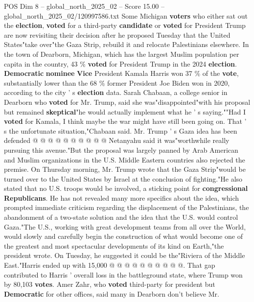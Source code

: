 \begin{textsample}{POS Dim 8 – global\_north\_2025\_02 – Score 15.00 – global\_north\_2025\_02/120997586.txt}  \label{ex:f8_pos_309}
Some Michigan \textbf{voters} who either sat out the \textbf{election}, \textbf{voted} for a third-party \textbf{candidate} or \textbf{voted} for President Trump are now revisiting their decision after he proposed Tuesday that the United States"take over"the Gaza Strip, rebuild it and relocate Palestinians elsewhere.
In the town of Dearborn, Michigan, which has the largest Muslim population per capita in the country, 43 \% \textbf{voted} for President Trump in the 2024 \textbf{election}. \textbf{Democratic} \textbf{nominee} \textbf{Vice} President Kamala Harris won 37 \% of the \textbf{vote}, substantially lower than the 68 \% former President Joe Biden won in 2020, according to the city ' s \textbf{election} data.
Sarah Chabaan, a college senior in Dearborn who \textbf{voted} for Mr.
Trump, said she was"disappointed"with his proposal but remained \textbf{skeptical}"he would actually implement what he ' s saying.""Had I \textbf{voted} for Kamala, I think maybe the war might have still been going on.
That ' s the unfortunate situation,"Chabaan said.
Mr.
Trump ' s Gaza idea has been defended @ @ @ @ @ @ @ @ @ @ Netanyahu said it was"worthwhile really pursuing this avenue."But the proposal was largely panned by Arab American and Muslim organizations in the U.S.
Middle Eastern countries also rejected the premise.
On Thursday morning, Mr.
Trump wrote that the Gaza Strip"would be turned over to the United States by Israel at the conclusion of fighting."He also stated that no U.S. troops would be involved, a sticking point for \textbf{congressional} \textbf{Republicans}.
He has not revealed many more specifics about the idea, which prompted immediate criticism regarding the displacement of the Palestinians, the abandonment of a two-state solution and the idea that the U.S. would control Gaza."The U.S., working with great development teams from all over the World, would slowly and carefully begin the construction of what would become one of the greatest and most spectacular developments of its kind on Earth,"the president wrote.
On Tuesday, he suggested it could be the"Riviera of the Middle East."Harris ended up with 15,000 @ @ @ @ @ @ @ @ @ @.
That gap contributed to Harris ' overall loss in the battleground state, where Trump won by 80,103 \textbf{votes}.
Amer Zahr, who \textbf{voted} third-party for president but \textbf{Democratic} for other offices, said many in Dearborn don't believe Mr.

\end{textsample}
